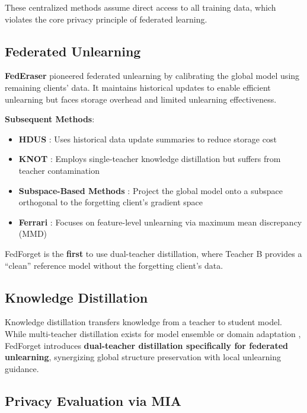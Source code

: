 \documentclass[10pt,twocolumn]{article}
\begin{document}
These centralized methods assume direct access to all training data, which violates the core privacy principle of federated learning.

\subsection{Federated Unlearning}

\textbf{FedEraser} \cite{liu2021federaser} pioneered federated unlearning by calibrating the global model using remaining clients' data. It maintains historical updates to enable efficient unlearning but faces storage overhead and limited unlearning effectiveness.

\textbf{Subsequent Methods}:

\begin{itemize}
\item \textbf{HDUS} \cite{gao2022verifi}: Uses historical data update summaries to reduce storage cost
\item \textbf{KNOT} \cite{wu2023federated}: Employs single-teacher knowledge distillation but suffers from teacher contamination
\item \textbf{Subspace-Based Methods} \cite{halimi2022federated}: Project the global model onto a subspace orthogonal to the forgetting client's gradient space
\item \textbf{Ferrari} \cite{ferrari2024efficient}: Focuses on feature-level unlearning via maximum mean discrepancy (MMD)
\end{itemize}

FedForget is the \textbf{first} to use dual-teacher distillation, where Teacher B provides a ``clean'' reference model without the forgetting client's data.

\subsection{Knowledge Distillation}

Knowledge distillation \cite{hinton2015distilling} transfers knowledge from a teacher to student model. While multi-teacher distillation exists for model ensemble \cite{you2017learning} or domain adaptation \cite{shen2021deep}, FedForget introduces \textbf{dual-teacher distillation specifically for federated unlearning}, synergizing global structure preservation with local unlearning guidance.

\subsection{Privacy Evaluation via MIA}
\end{document}
